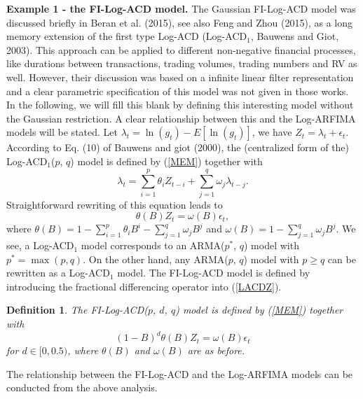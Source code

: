 \documentclass[12pt]{article}
\newtheorem{definition}{Definition}
\begin{document}
{\bf Example 1 - the FI-Log-ACD model.} The Gaussian FI-Log-ACD model was discussed briefly in Beran et al. (2015), see also Feng and Zhou (2015), as a long memory extension of the first type Log-ACD (Log-ACD$_1$, Bauwens and Giot, 2003). This approach can be applied to different non-negative financial processes, like durations between transactions, trading volumes, trading numbers and RV as well. However, their discussion was based on a infinite linear filter representation and a clear parametric specification of this model was not given in those works. In the following, we will fill this blank by defining this interesting model without the Gaussian restriction. A clear relationship between this and the Log-ARFIMA models will be stated. Let $\lambda_t=\ln(g_t)-E[\ln(g_t)]$, we have $Z_t=\lambda_t+\epsilon_t$. According to Eq. (10) of Bauwens and giot (2000), the (centralized form of the) Log-ACD$_1$($p$, $q$) model is defined by (\ref{MEM}) together with
\begin{equation}\label{LACDL}  
\lambda_t = \sum_{i=1}^p \theta_i Z_{t-i} +  \sum_{j=1}^q \omega_j \lambda_{t-j}. 
\end{equation}
Straightforward rewriting of this equation leads to
\begin{equation}\label{LACDZ}  
\theta(B) Z_t = \omega(B) \epsilon_t, 
\end{equation}
where $\theta(B)=1-\sum_{i=1}^p \theta_i B^i - \sum_{j=1}^q \omega_j B^j$ and $\omega(B)=1- \sum_{j=1}^q \omega_j B^j$. We see, a Log-ACD$_1$ model corresponds to an ARMA($p^*$, $q$) model with $p^*=\max(p, q)$. On the other hand, any ARMA($p$, $q$) model with $p\ge q$ can be rewritten as a Log-ACD$_1$ model. The FI-Log-ACD model is defined by introducing the fractional differencing operator into (\ref{LACDZ}). 
\begin{definition}
The FI-Log-ACD($p$, $d$, $q$) model is defined by (\ref{MEM}) together with 
\begin{equation}\label{FILACDZ}  
(1-B)^d \theta(B) Z_t = \omega(B) \epsilon_t
\end{equation}
for $d\in[0, 0.5)$, where $\theta(B)$ and $\omega(B)$ are as before. 
\end{definition}
The relationship between the FI-Log-ACD and the Log-ARFIMA models can be conducted from the above analysis.  
\end{document}
